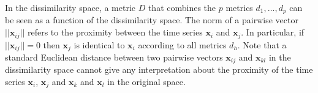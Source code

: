 In the dissimilarity space, a metric $D$ that combines the $p$ metrics $d_1, \ldots, d_p$ can be seen as a function of the dissimilarity space. The norm of a pairwise vector $||\textbf{x}_{ij}||$ refers to the proximity between the time series $\textbf{x}_i$ and $\textbf{x}_j$. In particular, if $||\textbf{x}_{ij}||=0$ then $\textbf{x}_j$ is identical to $\textbf{x}_i$ according to all metrics $d_h$. Note that a standard Euclidean distance between two pairwise vectors $\textbf{x}_{ij}$ and $\textbf{x}_{kl}$ in the dissimilarity space cannot give any interpretation about the proximity of the time series $\textbf{x}_i$, $\textbf{x}_j$ and $\textbf{x}_k$ and $\textbf{x}_l$ in the original space.


%
%

